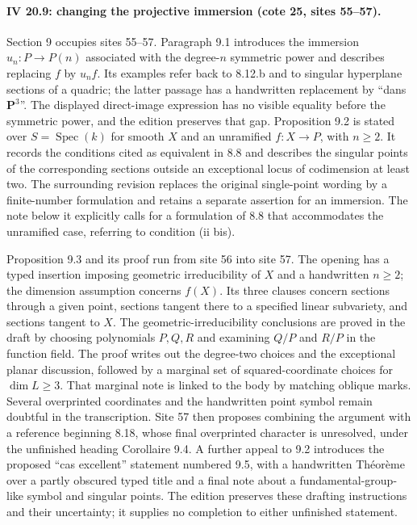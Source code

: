 \paragraph{IV 20.9: changing the projective immersion (cote 25, sites 55--57).}
Section 9 occupies sites 55--57. Paragraph 9.1 introduces the immersion $u_n:P\to P(n)$ associated with the degree-$n$ symmetric power and describes replacing $f$ by $u_nf$. Its examples refer back to 8.12.b and to singular hyperplane sections of a quadric; the latter passage has a handwritten replacement by ``dans $\mathbf P^3$''. The displayed direct-image expression has no visible equality before the symmetric power, and the edition preserves that gap. Proposition 9.2 is stated over $S=\operatorname{Spec}(k)$ for smooth $X$ and an unramified $f:X\to P$, with $n\geq2$. It records the conditions cited as equivalent in 8.8 and describes the singular points of the corresponding sections outside an exceptional locus of codimension at least two. The surrounding revision replaces the original single-point wording by a finite-number formulation and retains a separate assertion for an immersion. The note below it explicitly calls for a formulation of 8.8 that accommodates the unramified case, referring to condition (ii bis).

Proposition 9.3 and its proof run from site 56 into site 57. The opening has a typed insertion imposing geometric irreducibility of $X$ and a handwritten $n\geq2$; the dimension assumption concerns $f(X)$. Its three clauses concern sections through a given point, sections tangent there to a specified linear subvariety, and sections tangent to $X$. The geometric-irreducibility conclusions are proved in the draft by choosing polynomials $P,Q,R$ and examining $Q/P$ and $R/P$ in the function field. The proof writes out the degree-two choices and the exceptional planar discussion, followed by a marginal set of squared-coordinate choices for $\dim L\geq3$. That marginal note is linked to the body by matching oblique marks. Several overprinted coordinates and the handwritten point symbol remain doubtful in the transcription. Site 57 then proposes combining the argument with a reference beginning 8.18, whose final overprinted character is unresolved, under the unfinished heading Corollaire 9.4. A further appeal to 9.2 introduces the proposed ``cas excellent'' statement numbered 9.5, with a handwritten Th\'eor\`eme over a partly obscured typed title and a final note about a fundamental-group-like symbol and singular points. The edition preserves these drafting instructions and their uncertainty; it supplies no completion to either unfinished statement.
